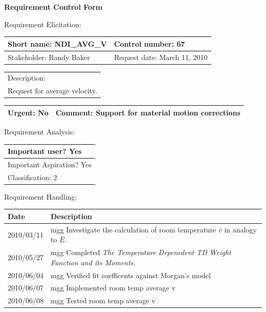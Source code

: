 \begin{center}\Large\bf
Requirement Control Form
\end{center}
\vspace{24pt}

Requirement Elicitation:

\begin{tabular}{|p{211pt}|p{211pt}|} \hline
Short name: NDI\_AVG\_V & Control number: 67\\ \hline
Stakeholder: Randy Baker & Request date: March 11, 2010\\
\end{tabular}
\begin{tabular}{|p{433pt}|} \hline
Description: \\ 
Request for average velocity.
\\ \hline
\end{tabular} 
\begin{tabular}{|p{211pt}|p{211pt}|} \hline
Urgent: No & Comment: Support for material motion corrections
\\ \hline
\end{tabular}

\vspace{24pt}

Requirement Analysis:

\begin{tabular}{|p{433pt}|} \hline
Important user? Yes \\ \hline
Important Aspiration? Yes \\ \hline
Classification: 2 \\ \hline
\end{tabular}
\vspace{24pt}

Requirement Handling:

\begin{tabular}{|p{72pt}|p{351pt}|} \hline
Date & Description \\ \hline
2010/03/11 & mgg Investigate the calculation of room temperature
$\bar{v}$ in analogy to $\bar{E}$. \\ \hline
2010/05/27 & mgg Completed \emph{The Temperature Depenedent TD Weight
  Function and its Moments}. \\ \hline
2010/06/04 & mgg Verified fit coefficents against Morgan's model \\
\hline
2010/06/07 & mgg Implemented room temp average v \\ \hline
2010/06/08 & mgg Tested room temp average v \\ \hline  
\end{tabular}
